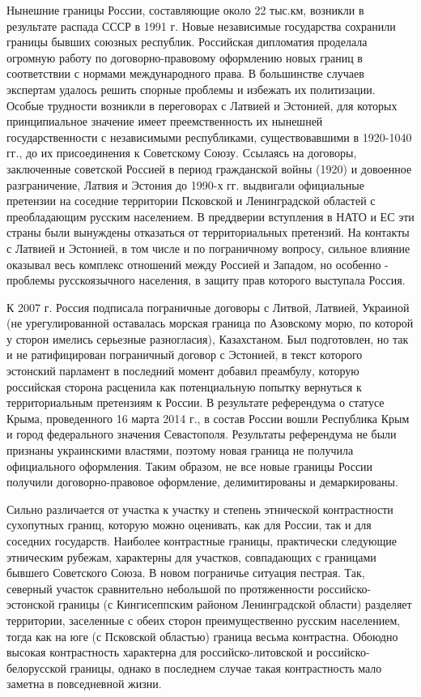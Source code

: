 \documentclass[]{book}
\begin{document}
Нынешние границы России, составляющие около 22 тыс.км, возникли в
результате распада СССР в 1991 г. Новые независимые государства
сохранили границы бывших союзных республик. Российская дипломатия
проделала огромную работу по договорно-правовому оформлению новых границ
в соответствии с нормами международного права. В большинстве случаев
экспертам удалось решить спорные проблемы и избежать их политизации.
Особые трудности возникли в переговорах с Латвией и Эстонией, для
которых принципиальное значение имеет преемственность их нынешней
государственности с независимыми республиками, существовавшими в
1920-1040 гг., до их присоединения к Советскому Союзу. Ссылаясь на
договоры, заключенные советской Россией в период гражданской войны
(1920) и довоенное разграничение, Латвия и Эстония до 1990-х гг.
выдвигали официальные претензии на соседние территории Псковской и
Ленинградской областей с преобладающим русским населением. В преддверии
вступления в НАТО и ЕС эти страны были вынуждены отказаться от
территориальных претензий. На контакты с Латвией и Эстонией, в том числе
и по пограничному вопросу, сильное влияние оказывал весь комплекс
отношений между Россией и Западом, но особенно - проблемы русскоязычного
населения, в защиту прав которого выступала Россия.

К 2007 г. Россия подписала пограничные договоры с Литвой, Латвией,
Украиной (не урегулированной оставалась морская граница по Азовскому
морю, по которой у сторон имелись серьезные разногласия), Казахстаном.
Был подготовлен, но так и не ратифицирован пограничный договор с
Эстонией, в текст которого эстонский парламент в последний момент
добавил преамбулу, которую российская сторона расценила как
потенциальную попытку вернуться к территориальным претензиям к России. В
результате референдума о статусе Крыма, проведенного 16 марта 2014 г., в
состав России вошли Республика Крым и город федерального значения
Севастополя. Результаты референдума не были признаны украинскими
властями, поэтому новая граница не получила официального оформления.
Таким образом, не все новые границы России получили договорно-правовое
оформление, делимитированы и демаркированы.

Сильно различается от участка к участку и степень этнической
контрастности сухопутных границ, которую можно оценивать, как для
России, так и для соседних государств. Наиболее контрастные границы,
практически следующие этническим рубежам, характерны для участков,
совпадающих с границами бывшего Советского Союза. В новом пограничье
ситуация пестрая. Так, северный участок сравнительно небольшой по
протяженности российско-эстонской границы (с Кингисеппским районом
Ленинградской области) разделяет территории, заселенные с обеих сторон
преимущественно русским населением, тогда как на юге (с Псковской
областью) граница весьма контрастна. Обоюдно высокая контрастность
характерна для российско-литовской и российско-белорусской границы,
однако в последнем случае такая контрастность мало заметна в
повседневной жизни.
\end{document}
